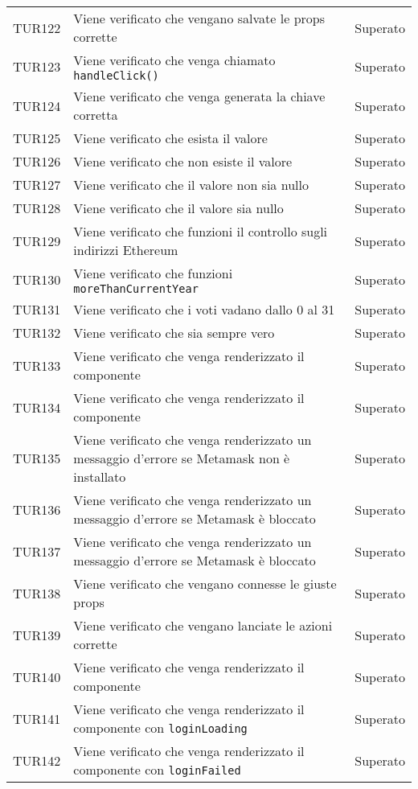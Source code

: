 \documentclass[PianoDiQualifica.tex]{subfiles}
\begin{document}
\begin{longtable}[H]{P{2cm}P{8.5cm}P{3cm}}
	TUR122 & Viene verificato che vengano salvate le props corrette & Superato \\ 
	TUR123 & Viene verificato che venga chiamato \texttt{handleClick()} & Superato \\ 
	TUR124 & Viene verificato che venga generata la chiave corretta & Superato \\ 
	TUR125 & Viene verificato che esista il valore & Superato \\ 
	TUR126 & Viene verificato che non esiste il valore & Superato \\ 
	TUR127 & Viene verificato che il valore non sia nullo & Superato \\ 
	TUR128 & Viene verificato che il valore sia nullo & Superato \\ 
	TUR129 & Viene verificato che funzioni il controllo sugli indirizzi Ethereum & Superato \\ 
	TUR130 & Viene verificato che funzioni \texttt{moreThanCurrentYear} & Superato \\ 
	TUR131 & Viene verificato che i voti vadano dallo 0 al 31 & Superato \\ 
	TUR132 & Viene verificato che sia sempre vero & Superato \\ 
	TUR133 & Viene verificato che venga renderizzato il componente & Superato \\ 
	TUR134 & Viene verificato che venga renderizzato il componente & Superato \\ 
	TUR135 & Viene verificato che venga renderizzato un messaggio d'errore se Metamask non è installato & Superato \\ 
	TUR136 & Viene verificato che venga renderizzato un messaggio d'errore se Metamask è bloccato & Superato \\ 
	TUR137 & Viene verificato che venga renderizzato un messaggio d'errore se Metamask è bloccato & Superato \\ 
	TUR138 & Viene verificato che vengano connesse le giuste props & Superato \\ 
	TUR139 & Viene verificato che vengano lanciate le azioni corrette & Superato \\ 
	TUR140 & Viene verificato che venga renderizzato il componente & Superato \\ 
	TUR141 & Viene verificato che venga renderizzato il componente con \texttt{loginLoading} & Superato \\ 
	TUR142 & Viene verificato che venga renderizzato il componente con \texttt{loginFailed} & Superato \\ 

\end{longtable}
\end{document}
